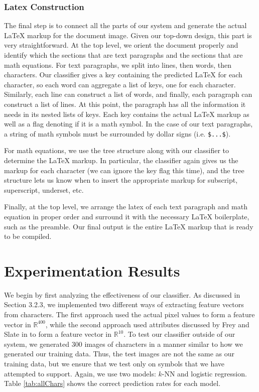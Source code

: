\documentclass[10pt]{IEEEtran}
\newcommand{\latex}{\LaTeX\xspace}
\begin{document}
\subsubsection{Latex Construction}

The final step is to connect all the parts of our system and generate the actual \latex markup for the document image. Given our top-down design, this part is very straightforward. At the top level, we orient the document properly and identify which the sections that are text paragraphs and the sections that are math equations. For text paragraphs, we split into lines, then words, then characters. Our classifier gives a key containing the predicted \latex for each character, so each word can aggregate a list of keys, one for each character. Similarly, each line can construct a list of words, and finally, each paragraph can construct a list of lines. At this point, the paragraph has all the information it needs in its nested lists of keys. Each key contains the actual \latex markup as well as a flag denoting if it is a math symbol. In the case of our text paragraphs, a string of math symbols must be surrounded by dollar signs (i.e. \texttt{\$...\$}).

For math equations, we use the tree structure along with our classifier to determine the \latex markup. In particular, the classifier again gives us the markup for each character (we can ignore the key flag this time), and the tree structure lets us know when to insert the appropriate markup for subscript, superscript, underset, etc.

Finally, at the top level, we arrange the latex of each text paragraph and math equation in proper order and surround it with the necessary \latex boilerplate, such as the preamble. Our final output is the entire \latex markup that is ready to be compiled.

\section{Experimentation Results}

We begin by first analyzing the effectiveness of our classifier. As discussed in Section 3.2.3, we implemented two different ways of extracting feature vectors from characters. The first approach used the actual pixel values to form a feature vector in $\mathbb{R}^{400}$, while the second approach used attributes discussed by Frey and Slate in \cite{2} to form a feature vector in $\mathbb{R}^{10}$. To test our classifier outside of our system, we generated $300$ images of characters in a manner similar to how we generated our training data. Thus, the test images are not the same as our training data, but we ensure that we test only on symbols that we have attempted to support. Again, we use two models: $k$-NN and logistic regression. Table \ref{tab:allChars} shows the correct prediction rates for each model.
\end{document}
